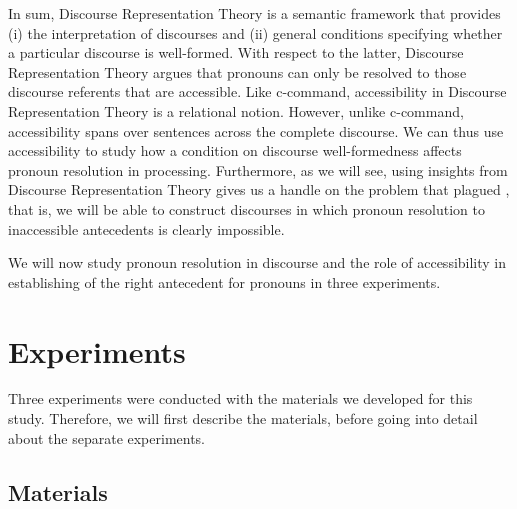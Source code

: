 \documentclass[11pt]{article} %
\begin{document}
In sum, Discourse Representation Theory is a semantic framework that provides (i) the interpretation of discourses and (ii) general conditions specifying whether a particular discourse is well-formed. With respect to the latter, Discourse Representation Theory argues that pronouns can only be resolved to those discourse referents that are accessible. Like c-command, accessibility in Discourse Representation Theory is a relational notion. However, unlike c-command, accessibility spans over sentences across the complete discourse. We can thus use accessibility to study how a condition on discourse well-formedness affects pronoun resolution in processing. Furthermore, as we will see, using insights from Discourse Representation Theory gives us a handle on the problem that plagued \cite{kush+15}, that is, we will be able to construct discourses in which pronoun resolution to inaccessible antecedents is clearly impossible.

We will now study pronoun resolution in discourse and the role of accessibility in establishing of the right antecedent for pronouns in three experiments.


\begin{comment}
\begin{itemize}
\item Problem with Kush et al. (2015): their `inaccessible' condition is not really inaccessible.
\item Our experiment is new because it goes beyond sentence borders. 
\end{itemize}
\end{comment}


\section{Experiments}

Three experiments were conducted with the materials we developed for this study. Therefore, we will first describe the materials, before going into detail about the separate experiments.

\subsection{Materials}
\end{document}
